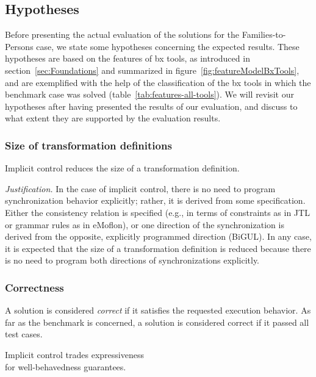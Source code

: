 \subsection{Hypotheses}
\label{sec:Hypotheses}

Before presenting the actual evaluation of the solutions for the Families-to-Persons case, we state some hypotheses concerning the expected results. These hypotheses are based on the features of bx tools, as introduced in section~\ref{sec:Foundations} and summarized in figure~\ref{fig:featureModelBxTools}, and are exemplified with the help of the classification of the bx tools in which the benchmark case was solved (table~\ref{tab:features-all-tools}). We will revisit our hypotheses after having presented the results of our evaluation, and discuss to what extent they are supported by the evaluation results. 

\subsubsection{Size of transformation definitions}
\label{sec:HypothesesSize}

\begin{hypothesis}
	\label{hyp:size1}
	Implicit control reduces the size of a transformation definition.
\end{hypothesis}

\emph{Justification.} In the case of implicit control, there is no need to program synchronization behavior explicitly; rather, it is derived from some specification. Either the consistency relation is specified (e.g., in terms of constraints as in JTL or grammar rules as in eMoflon), or one direction of the synchronization is derived from the opposite, explicitly programmed direction (BiGUL). In any case, it is expected that the size of a transformation definition is reduced because there is no need to program both directions of synchronizations explicitly. 

\subsubsection{Correctness}
\label{sec:HypothesesCorrectness}

A solution is considered \emph{correct} if it satisfies the requested execution behavior. As far as the benchmark is concerned, a solution is considered correct if it passed all test cases. 

\begin{hypothesis}
	\label{hyp:correctness1}
	Implicit control trades expressiveness\\for well-behavedness guarantees.
\end{hypothesis}

